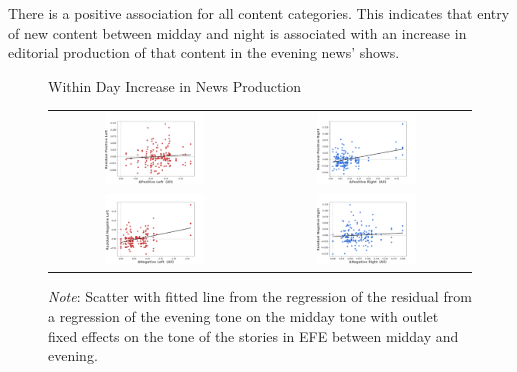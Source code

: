 \documentclass[12pt]{article}
\begin{document}
There is a positive association for all content categories. This indicates that entry of new content between midday and night is associated with an increase in editorial production of that content in the evening news' shows. 


\begin{figure}[ht!]
		\caption{Within Day Increase in News Production}
	\centering
	\begin{tabular}{@{}cc@{}}
		\includegraphics[width=0.5\textwidth]{figures/char_pos_left_residual} &
		\includegraphics[width=0.5\textwidth]{figures/char_pos_right_residual} \\[-.2pt]
		\includegraphics[width=0.5\textwidth]{figures/char_neg_left_residual} &
		\includegraphics[width=0.5\textwidth]{figures/char_neg_right_residual}
	\end{tabular}
	\caption*{\textit{Note}: \small Scatter with fitted line from the regression of the residual from a regression of the evening tone on the midday tone with outlet fixed effects on the tone of the stories in EFE between midday and evening.}

	\label{fig:diff}
\end{figure}
\end{document}
